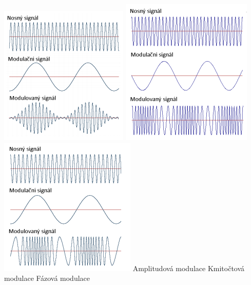 \includegraphics[scale=0.62]{images/-016.png}
\includegraphics[scale=0.62]{images/-017.png}
\includegraphics[scale=0.62]{images/-018.png}
Amplitudová modulace \hspace{1.5cm} Kmitočtová modulace \hspace{1.5cm} Fázová modulace

